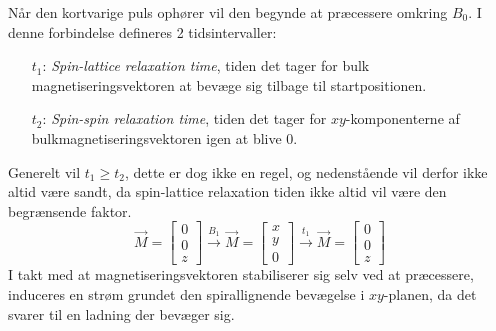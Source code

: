     Når den kortvarige puls ophører vil den begynde at præcessere omkring $B_0$. I denne forbindelse defineres 2 tidsintervaller:
    \begin{itemize}
        \item[$t_1$:] \textit{Spin-lattice relaxation time}, tiden det tager for bulk magnetiseringsvektoren at bevæge sig tilbage til startpositionen.
        \item[$t_2$:] \textit{Spin-spin relaxation time}, tiden det tager for $xy$-komponenterne af bulkmagnetiseringsvektoren igen at blive 0. 
    \end{itemize}
    Generelt vil $t_1 \geq t_2$, dette er dog ikke en regel, og nedenstående vil derfor ikke altid være sandt, da spin-lattice relaxation tiden ikke altid vil være den begrænsende faktor.
    \[
        \overrightarrow{M}=
        \begin{bmatrix}
            0 \\
            0 \\
            z
        \end{bmatrix}
        \stackrel{B_1}{\longrightarrow}
        \overrightarrow{M}=
        \begin{bmatrix}
            x \\
            y \\
            0
        \end{bmatrix}
        \stackrel{t_1}{\longrightarrow}
        \overrightarrow{M}=
        \begin{bmatrix}
            0 \\
            0 \\
            z
        \end{bmatrix}
    \]
    I takt med at magnetiseringsvektoren stabiliserer sig selv ved at præcessere, induceres en strøm grundet den spirallignende bevægelse i $xy$-planen, da det svarer til en ladning der bevæger sig.     
